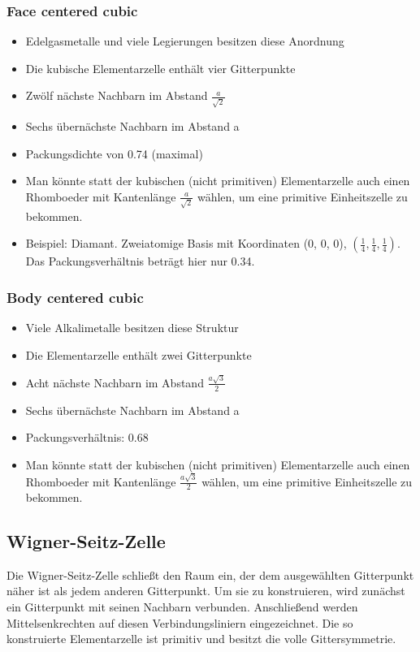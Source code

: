 \documentclass[11pt]{article}
\begin{document}
\subsubsection{Face centered cubic}
\begin{itemize}
  \item Edelgasmetalle und viele Legierungen besitzen diese Anordnung
  \item Die kubische Elementarzelle enthält vier Gitterpunkte
  \item Zwölf nächste Nachbarn im Abstand $\frac{a}{\sqrt{2}}$
  \item Sechs übernächste Nachbarn im Abstand a
  \item Packungsdichte von 0.74 (maximal)
  \item Man könnte statt der kubischen (nicht primitiven) Elementarzelle auch
  einen Rhomboeder mit Kantenlänge $\frac{a}{\sqrt{2}}$ wählen, um eine
  primitive Einheitszelle zu bekommen.
  \item Beispiel: Diamant. Zweiatomige Basis mit Koordinaten (0, 0, 0),
  $(\frac{1}{4}, \frac{1}{4}, \frac{1}{4})$. Das Packungsverhältnis beträgt hier
  nur 0.34.
\end{itemize}
\subsubsection{Body centered cubic}
\begin{itemize}
  \item Viele Alkalimetalle besitzen diese Struktur
  \item Die Elementarzelle enthält zwei Gitterpunkte
  \item Acht nächste Nachbarn im Abstand $\frac{a\sqrt{3}}{2}$
  \item Sechs übernächste Nachbarn im Abstand a
  \item Packungsverhältnis: 0.68
  \item Man könnte statt der kubischen (nicht primitiven) Elementarzelle auch
  einen Rhomboeder mit Kantenlänge $\frac{a\sqrt{3}}{2}$ wählen, um eine
  primitive Einheitszelle zu bekommen.
\end{itemize}
\subsection{Wigner-Seitz-Zelle}
Die Wigner-Seitz-Zelle schließt den Raum ein, der dem ausgewählten Gitterpunkt
näher ist als jedem anderen Gitterpunkt. Um sie zu konstruieren, wird zunächst
ein Gitterpunkt mit seinen Nachbarn verbunden. Anschließend werden
Mittelsenkrechten auf diesen Verbindungsliniern eingezeichnet. Die so
konstruierte Elementarzelle ist primitiv und besitzt die volle Gittersymmetrie.
\end{document}
